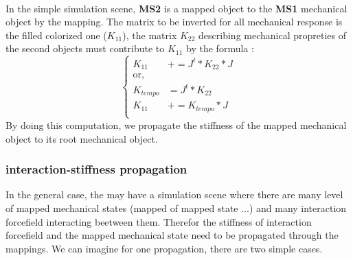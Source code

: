 \documentclass[a4paper,10pt]{article}
\begin{document}
\[\begin{array}{cc}
\end{array}
\]
In the simple simulation scene, \textbf{MS2} is a mapped object to the \textbf{MS1} mechanical object by the mapping. The matrix to be inverted for all mechanical response is the filled colorized one ($K_{11}$), the matrix $K_{22}$ describing mechanical propreties of the second objects must contribute to $K_{11}$ by the formula :
\[
\left\{ 
\begin{array}{ll}
K_{11}       & += J^t * K_{22} * J               \\
\text{or,}   &         \\
K_{tempo}    & =  J^t * K_{22}                   \\
K_{11}       & += K_{tempo} * J                  \\         
\end{array}
\right.
\]
By doing this computation, we propagate the stiffness of the mapped mechanical object to its root mechanical object.
\subsubsection{interaction-stiffness propagation }
In the general case, the may have a simulation scene where there are many level of mapped mechanical states (mapped of mapped state ...) and many interaction forcefield interacting beetween them. Therefor the stiffness of interaction forcefield and the mapped mechanical state need to be propagated through the mappings. We can imagine for one propagation, there are two simple cases.
\end{document}
